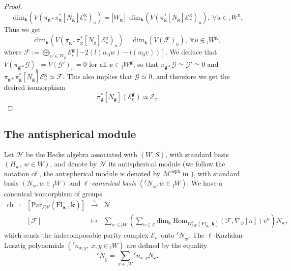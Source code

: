 \documentclass[11pt]{amsart}
\theoremstyle{plain}
\theoremstyle{remark}
\numberwithin{equation}{section}
\begin{document}
\begin{proof}
		$$\mathrm{dim}_\mathbf{k}(V(\pi_{\mathbf{g}*}\pi_{\mathbf{g}}^*[N_{\mathbf{g}}]\mathcal{E}^\mathbf{g}_v)_{u})=|W_\mathbf{g}|\cdot\mathrm{dim}_\mathbf{k}(V(\pi_{\mathbf{g}}^*[N_{\mathbf{g}}]\mathcal{E}^\mathbf{g}_v)_{u}),~\forall u\in {_\mathrm{f}W}^\mathbf{g}. $$
		Thus we get  $$\mathrm{dim}_\mathbf{k}(V(\pi_{\mathbf{g}*}\pi_{\mathbf{g}}^*[N_{\mathbf{g}}]\mathcal{E}^\mathbf{g}_v)_{u})=\mathrm{dim}_\mathbf{k}(V(\mathcal{F})_{u}),~ \forall u\in {_\mathrm{f}W}^\mathbf{g},$$
		where $\mathcal{F}:=\bigoplus_{w\in W_\mathbf{g}}\mathcal{E}_v^\mathbf{g}[-2(l(w_0w)-l(w_0v))]$. We deduce that $V(\pi_{\mathbf{g}*}\mathcal{G})_u=V(\mathcal{G}')_u=0$ for all $u\in {_\mathrm{f}W}^\mathbf{g}$, so that $\pi_{\mathbf{g}*}\mathcal{G}\simeq\mathcal{G}'\simeq 0$ and $\pi_{\mathbf{g}*}\pi_{\mathbf{g}}^*[N_{\mathbf{g}}]\mathcal{E}^\mathbf{g}_v\simeq \mathcal{F}$. This also implies that $\mathcal{G}\simeq 0$, and therefore we get the desired isomorphism
		$$\pi_{\mathbf{g}}^*[N_{\mathbf{g}}](\mathcal{E}_v^\mathbf{g})\simeq \mathcal{E}_v.$$	\end{proof}	
	\subsection{The antispherical module} Let $\mathcal{H}$ be the Hecke algebra associated with $(W,S)$, with standard basis $(H_w,~w\in W)$, and denote by $\mathcal{N}$ its antispherical module (we follow the notation of \cite[§3]{Soergel1997KazhdanLusztigPA}, the antispherical module is denoted by $\mathcal{M}^{\mathrm{asph}}$ in \cite{riche2020smithtreumann}), with standard basis $(N_w,w\in {_\mathrm{f}W})$ and \textit{$\ell$-canonical basis} $({^\ell\underline{N}}_w,w\in {_\mathrm{f}W})$. We have a canonical isomorphism of groups
	$$\begin{array}{ccccl}
		\mathrm{ch} & : & [\mathrm{Par}_{\mathcal{IW}}(\mathrm{Fl}^{\circ}_{\mathbf{a}_1},\mathbf{k})]&  \xrightarrow{\sim} & \mathcal{N}\\
		&   & [\mathcal{F}]           & \mapsto  &\sum_{w\in {_\mathrm{f}W}}\left(\sum_{n\in\mathbb{Z}}\mathrm{dim}_\mathbf{k}~\mathrm{Hom}_{D^b_{\mathcal{IW}}(\mathrm{Fl}^{\circ}_{\mathbf{a}_1},\mathbf{k})}(\mathcal{F},\nabla_w[n])v^n\right)N_w,
	\end{array}$$
	which sends the indecomposable parity complex $\mathcal{E}_w$ onto ${^\ell\underline{N}}_w$. The $\ell$-Kazhdan-Lusztig polynomials $({^\ell n}_{x,y},~x,y\in {_\mathrm{f}W})$ are defined by the equality 
	\begin{equation}\label{def antispheric}
		{^\ell\underline{N}}_y=\sum_{x\in {_\mathrm{f}W}}{^\ell n}_{x,y}N_x.
	\end{equation}
	
\end{document}

